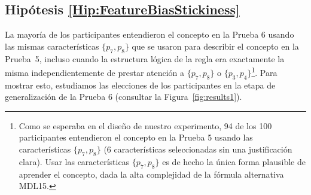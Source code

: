 \subsection{Hipótesis \ref{Hip:FeatureBiasStickiness}}\label{Results:FeatureBiasStickiness}

La mayoría de los participantes entendieron el concepto en la Prueba 6 usando las mismas características $ \{p_7, p_8 \} $ que se usaron para describir el concepto en la Prueba~5, incluso cuando la estructura lógica de la regla era exactamente la misma independientemente de prestar atención a $ \{ p_7, p_8 \} $ o $  \{p_3, p_4 \} $\footnote{Como se esperaba en el diseño de nuestro experimento, 94 de los 100 participantes entendieron el concepto en la Prueba 5 usando las características $ \{p_7, p_8 \} $ (6 características seleccionadas sin una justificación clara). Usar las características $ \{p_7, p_8 \} $ es de hecho la única forma plausible de aprender el concepto, dada la alta complejidad de la fórmula alternativa MDL15.}. Para mostrar esto, estudiamos las elecciones de los participantes en la etapa de generalización de la Prueba 6 (consultar la Figura~\ref{fig:results1}).

